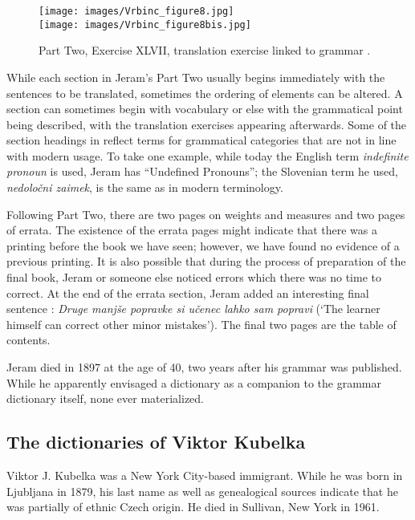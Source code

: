 \documentclass[output=paper,colorlinks,citecolor=brown,arabicfont,chinesefont]{langscibook}
\begin{document}
\begin{figure}
\texttt{[image: images/Vrbinc\_figure8.jpg]}\\
\texttt{[image: images/Vrbinc\_figure8bis.jpg]}
\caption{Part Two, Exercise XLVII, translation exercise linked to grammar \citep[87--88]{Jeram1895}.}
\label{vrbinc:fig8}
\end{figure}

While each section in Jeram’s Part Two usually begins immediately with the sentences to be translated, sometimes the ordering of elements can be altered. A section can sometimes begin with vocabulary or else with the grammatical point being described, with the translation exercises appearing afterwards. Some of the section headings in \citet{Jeram1895} reflect terms for grammatical categories that are not in line with modern usage. To take one example, while today the English term \emph{indefinite pronoun} is used, Jeram has “Undefined Pronouns”; the Slovenian term he used, \emph{nedoločni zaimek}, is the same as in modern terminology.

Following Part Two, there are two pages on weights and measures and two pages of errata. The existence of the errata pages might indicate that there was a printing before the book we have seen; however, we have found no evidence of a previous printing. It is also possible that during the process of preparation of the final book, Jeram or someone else noticed errors which there was no time to correct. At the end of the errata section, Jeram added an interesting final sentence \citep[177]{Jeram1895}: \emph{Druge manjše popravke si učenec lahko sam popravi} (`The learner himself can correct other minor mistakes'). The final two pages are the table of contents.

Jeram died in 1897 at the age of 40, two years after his grammar was published. While he apparently envisaged a dictionary as a companion to the grammar dictionary itself\citep[16]{Jeram1895}, none ever materialized.

\subsection{The dictionaries of Viktor Kubelka}

Viktor J. Kubelka was a New York City-based immigrant. While he was born in Ljubljana in 1879, his last name as well as genealogical sources indicate that he was partially of ethnic Czech origin. He died in Sullivan, New York in 1961.
\end{document}
